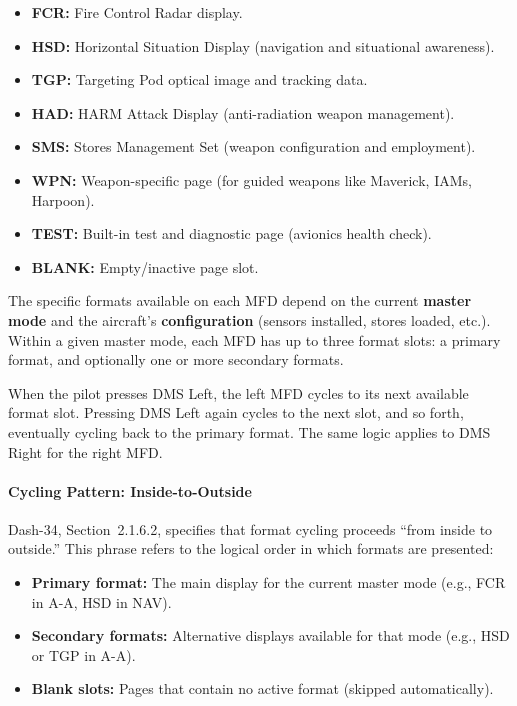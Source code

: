 \documentclass[11pt,a4paper]{article}
\begin{document}
\begin{itemize}

\item \textbf{FCR:} Fire Control Radar display.

\item \textbf{HSD:} Horizontal Situation Display (navigation and situational awareness).

\item \textbf{TGP:} Targeting Pod optical image and tracking data.

\item \textbf{HAD:} HARM Attack Display (anti-radiation weapon management).

\item \textbf{SMS:} Stores Management Set (weapon configuration and employment).

\item \textbf{WPN:} Weapon-specific page (for guided weapons like Maverick, IAMs, Harpoon).

\item \textbf{TEST:} Built-in test and diagnostic page (avionics health check).

\item \textbf{BLANK:} Empty/inactive page slot.

\end{itemize}

The specific formats available on each MFD depend on the current \textbf{master mode} and the aircraft's \textbf{configuration} (sensors installed, stores loaded, etc.). Within a given master mode, each MFD has up to three format slots: a primary format, and optionally one or more secondary formats.

When the pilot presses DMS Left, the left MFD cycles to its next available format slot. Pressing DMS Left again cycles to the next slot, and so forth, eventually cycling back to the primary format. The same logic applies to DMS Right for the right MFD.

\paragraph*{Cycling Pattern: Inside-to-Outside}

Dash-34, Section~2.1.6.2, specifies that format cycling proceeds ``from inside to outside.'' This phrase refers to the logical order in which formats are presented:

\begin{itemize}

\item \textbf{Primary format:} The main display for the current master mode (e.g., FCR in A-A, HSD in NAV).

\item \textbf{Secondary formats:} Alternative displays available for that mode (e.g., HSD or TGP in A-A).

\item \textbf{Blank slots:} Pages that contain no active format (skipped automatically).

\end{itemize}
\end{document}
